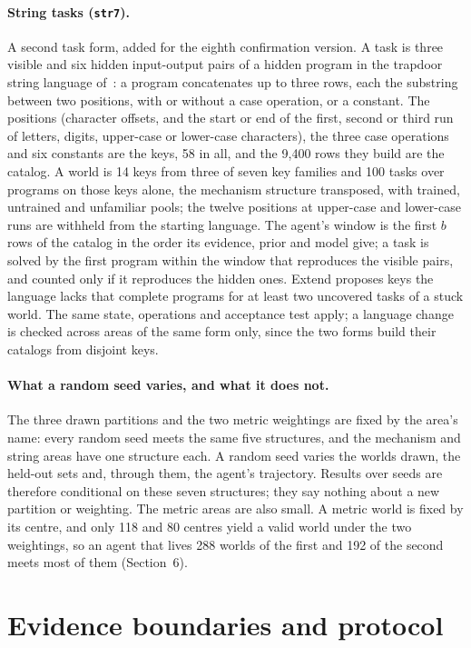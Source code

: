 \documentclass[11pt]{article}
\begin{document}
\paragraph{String tasks (\texttt{str7}).} A second task form, added for the eighth confirmation version. A task is three visible and six hidden input-output pairs of a hidden program in the trapdoor string language of~\cite{strozzi2026}: a program concatenates up to three rows, each the substring between two positions, with or without a case operation, or a constant. The positions (character offsets, and the start or end of the first, second or third run of letters, digits, upper-case or lower-case characters), the three case operations and six constants are the keys, 58 in all, and the 9,400 rows they build are the catalog. A world is 14 keys from three of seven key families and 100 tasks over programs on those keys alone, the mechanism structure transposed, with trained, untrained and unfamiliar pools; the twelve positions at upper-case and lower-case runs are withheld from the starting language. The agent's window is the first $b$ rows of the catalog in the order its evidence, prior and model give; a task is solved by the first program within the window that reproduces the visible pairs, and counted only if it reproduces the hidden ones. Extend proposes keys the language lacks that complete programs for at least two uncovered tasks of a stuck world. The same state, operations and acceptance test apply; a language change is checked across areas of the same form only, since the two forms build their catalogs from disjoint keys.

\paragraph{What a random seed varies, and what it does not.} The three drawn partitions and the two metric weightings are fixed by the area's name: every random seed meets the same five structures, and the mechanism and string areas have one structure each. A random seed varies the worlds drawn, the held-out sets and, through them, the agent's trajectory. Results over seeds are therefore conditional on these seven structures; they say nothing about a new partition or weighting. The metric areas are also small. A metric world is fixed by its centre, and only 118 and 80 centres yield a valid world under the two weightings, so an agent that lives 288 worlds of the first and 192 of the second meets most of them (Section~6).

\section{Evidence boundaries and protocol}
\end{document}
